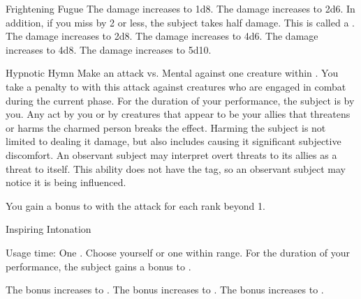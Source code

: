 {\begin{durationability}{Frightening Fugue}
                \rankline
                 The damage increases to 1d8.
                 The damage increases to 2d6.
                    In addition, if you miss by 2 or less, the subject takes half damage.
                    This is called a .
                 The damage increases to 2d8.
                 The damage increases to 4d6.
                 The damage increases to 4d8.
                 The damage increases to 5d10.
            \end{durationability}

            \begin{durationability}{Hypnotic Hymn}
                \rankline
                Make an attack vs. Mental against one creature within \medrange.
                You take a  penalty to  with this attack against creatures who are engaged in combat during the current phase.
                \hit For the duration of your performance, the subject is \charmed by you.
                Any act by you or by creatures that appear to be your allies that threatens or harms the charmed person breaks the effect.
                Harming the subject is not limited to dealing it damage, but also includes causing it significant subjective discomfort.
                An observant subject may interpret overt threats to its allies as a threat to itself.
                This ability does not have the  tag, so an observant subject may notice it is being influenced.

                \rankline
                You gain a  bonus to  with the attack for each rank beyond 1.
            \end{durationability}

            \begin{durationability}{Inspiring Intonation}
                \par \noindent Usage time: One .
                \rankline
                Choose yourself or one  within \rngmed range.
                For the duration of your performance, the subject gains a  bonus to .

                \rankline
                 The bonus increases to .
                 The bonus increases to .
                 The bonus increases to .
            \end{durationability}

}
